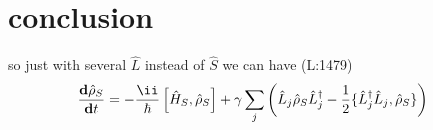  \section{conclusion}
 so just with several 
 $ \hat{L } $  instead of
 $ \hat{S } $  we can have 
(L:1479)
\begin{equation}
\begin{split}
\dfrac{\bold{d}\hat{\rho }_{S }}{\bold{d}t }&=-\frac{\ii }{\hbar }\left[\hat{H }_{S },\hat{\rho }_{S }\right]+\gamma \sum _{j }\left(\hat{L }_{j }\hat{\rho }_{S }\hat{L }_{j }^\dagger -\frac{1}{2}\{\hat{L }_{j }^\dagger \hat{L }_{j },\hat{\rho }_{S }\}\right)\end{split}
\end{equation}
